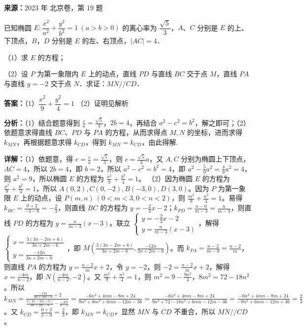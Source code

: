 \begin{question}[points=15]
\textbf{来源：}2023 年 北京卷，第 19 题\par
已知椭圆 $E: \dfrac{x^2}{a^2} + \dfrac{y^2}{b^2} = 1\ (a>b>0)$ 的离心率为 $\dfrac{\sqrt{5}}{3}$，$A$、$C$ 分别是 $E$ 的上、下顶点，$B$，$D$ 分别是 $E$ 的左、右顶点，$|AC|=4$．

（1）求 $E$ 的方程；

（2）设 $P$ 为第一象限内 $E$ 上的动点，直线 $PD$ 与直线 $BC$ 交于点 $M$，直线 $PA$ 与直线 $y=-2$ 交于点 $N$．求证：$MN//CD$．
\begin{solution}
\textbf{答案：}（1）$\dfrac{x^2}{9}+\dfrac{y^2}{4}=1$ （2）证明见解析

\textbf{分析：}（1）结合题意得到 $\frac{c}{a}=\frac{\sqrt{5}}{3}$，$2b=4$，再结合 $a^2-c^2=b^2$，解之即可；（2）依题意求得直线 $BC$、$PD$ 与 $PA$ 的方程，从而求得点 $M,N$ 的坐标，进而求得 $k_{MN}$，再根据题意求得 $k_{CD}$，得到 $k_{MN}=k_{CD}$，由此得解.

\textbf{详解：}（1）依题意，得 $e=\frac{c}{a}=\frac{\sqrt{5}}{3}$，则 $c=\frac{\sqrt{5}}{3}a$，又 $A,C$ 分别为椭圆上下顶点，$AC=4$，所以 $2b=4$，即 $b=2$，所以 $a^2-c^2=b^2=4$，即 $a^2-\frac{5}{9}a^2=\frac{4}{9}a^2=4$，则 $a^2=9$，所以椭圆 $E$ 的方程为 $\frac{x^2}{9}+\frac{y^2}{4}=1$。
（2）因为椭圆 $E$ 的方程为 $\frac{x^2}{9}+\frac{y^2}{4}=1$，所以 $A(0,2), C(0,-2), B(-3,0), D(3,0)$。因为 $P$ 为第一象限 $E$ 上的动点，设 $P(m,n)\ (0<m<3,0<n<2)$，则 $\frac{m^2}{9}+\frac{n^2}{4}=1$。易得 $k_{BC}=\frac{0+2}{-3-0}=-\frac{2}{3}$，则直线 $BC$ 的方程为 $y=-\frac{2}{3}x-2$；$k_{PD}=\frac{n-0}{m-3}=\frac{n}{m-3}$，则直线 $PD$ 的方程为 $y=\frac{n}{m-3}(x-3)$。联立 $\begin{cases} y=-\frac{2}{3}x-2 \\ y=\frac{n}{m-3}(x-3) \end{cases}$，解得 $\begin{cases} x=\frac{3(3n-2m+6)}{3n+2m-6} \\ y=\frac{-12n}{3n+2m-6} \end{cases}$，即 $M\left(\frac{3(3n-2m+6)}{3n+2m-6}, \frac{-12n}{3n+2m-6}\right)$。而 $k_{PA}=\frac{n-2}{m-0}=\frac{n-2}{m}$，则直线 $PA$ 的方程为 $y=\frac{n-2}{m}x+2$，令 $y=-2$，则 $-2=\frac{n-2}{m}x+2$，解得 $x=\frac{-4m}{n-2}$，即 $N\left(\frac{-4m}{n-2},-2\right)$。又 $\frac{m^2}{9}+\frac{n^2}{4}=1$，则 $m^2=9-\frac{9n^2}{4}$，$8m^2=72-18n^2$。所以 $k_{MN}=\frac{\frac{-12n}{3n+2m-6}+2}{\frac{3(3n-2m+6)}{3n+2m-6}-\frac{-4m}{n-2}} = \frac{-6n^2+4mn-8m+24}{9n^2+8m^2+6mn-12m-36} = \frac{-6n^2+4mn-8m+24}{9n^2+72-18n^2+6mn-12m-36} = \frac{-6n^2+4mn-8m+24}{-9n^2+6mn-12m+36} = \frac{2}{3}$。又 $k_{CD}=\frac{0+2}{3-0}=\frac{2}{3}$，即 $k_{MN}=k_{CD}$，显然 $MN$ 与 $CD$ 不重合，所以 $MN//CD$。
\end{solution}
\end{question}

